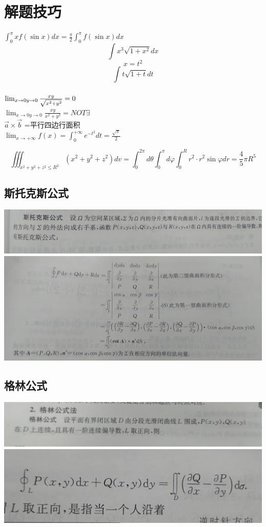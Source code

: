 \documentclass[UTF8]{ctexart}
\begin{document}
\section{解题技巧}
$\int_0^\pi xf(\sin x ) dx = \frac{\pi}{2} \int_0^\pi f(\sin x) dx$ \\
$$ \int x^3 \sqrt{1+x^2} dx$$
$$ x= t^2 $$
$$ \int t \sqrt{1+t} dt $$
\\
$\lim_{x\rightarrow 0 \\ y \rightarrow 0} \frac{xy}{\sqrt{x^2+y^2}}=0$ \\
$\lim_{x\rightarrow 0 y \rightarrow 0} \frac{xy}{x^2+y^2} = NOT \exists$
\\
$\overrightarrow{a}\times \overrightarrow{b}$ =平行四边行面积
\\
$ \lim_{x \rightarrow + \infty } f(x) = \int_0^{+ \infty } e^{-t^2} dt = \frac{\sqrt{\pi}}{2}$

$$\iiint_{x^2+y^2+z^2  \leq R^2} (x^2+y^2+z^2)dv=\int_0^{2\pi} d \theta \int_0^\pi d \varphi \int_0^R r^2 \cdot r^2 \sin \varphi dr = \frac{4}{5}\pi R^5 $$

\subsection{斯托克斯公式}
\includegraphics[width=14cm]{9345E7/IMG_20180419_111338.jpg}
\includegraphics[width=14cm]{9345E7/IMG_20180419_111319.jpg}
\subsection{格林公式}
\includegraphics[width=14cm]{9345E7/IMG_20180419_111029.jpg}
\includegraphics[width=14cm]{9345E7/IMG_20180419_111105.jpg}
\end{document}
